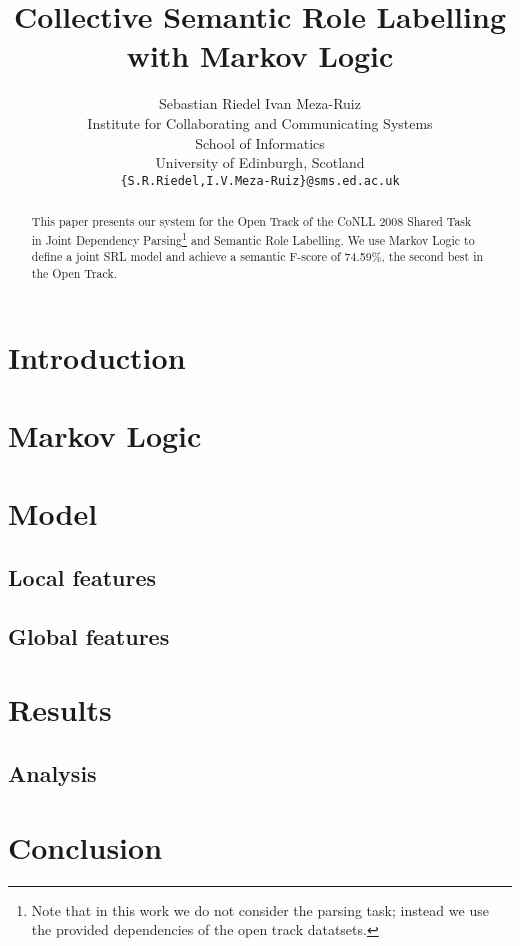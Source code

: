 \documentclass[11pt]{article}
\title{Collective Semantic Role Labelling with Markov Logic}
\author{Sebastian Riedel \qquad Ivan Meza-Ruiz\\
  Institute for Collaborating and Communicating Systems\\
  School of Informatics\\
  University of Edinburgh, Scotland\\
  {\tt\{S.R.Riedel,I.V.Meza-Ruiz\}@sms.ed.ac.uk} }
\date{}
\begin{document}
 


\maketitle
\begin{abstract}
  This paper presents our system for the Open Track of the CoNLL 2008 Shared Task~\citep{surdeanu08conll} in Joint Dependency Parsing\footnote{Note that in this work we do not consider the parsing task; instead we use the provided dependencies of the open track datatsets.} and Semantic Role Labelling. We use Markov Logic to define a joint SRL model and achieve a semantic F-score of 74.59\%, the second best in the Open Track.
\end{abstract}

\section{Introduction}



\section{Markov Logic} \label{sec:markovlogic}



\section{Model} \label{sec:model} 


\subsection{Local features}



\subsection{Global features}



\section{Results}\label{sec:results}


\subsection{Analysis}


\section{Conclusion} \label{sec:conclusion}





\end{document}
